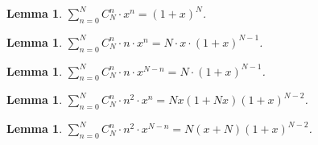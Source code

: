 \documentclass{article}
\newtheorem{lemma}[theorem]{Lemma}
\begin{document}
\begin{lemma}
\label{Sum1}
$\sum_{n=0}^{N}C_N^{n}\cdot x^{n}=(1+x)^N$.
\end{lemma}
\begin{lemma}
\label{Sum2}
$\sum_{n=0}^{N} C_N^{n}\cdot n\cdot x^{n}=N\cdot x\cdot (1+x)^{N-1}$.
\end{lemma}
\begin{lemma}
\label{Sum3}
$\sum_{n=0}^{N} C_N^{n}\cdot n\cdot x^{N-n}=N\cdot (1+x)^{N-1}$.
\end{lemma}
\begin{lemma}
\label{Sum5}
$\sum_{n=0}^{N} C_N^{n}\cdot n^2\cdot x^{n}=Nx(1+Nx)(1+x)^{N-2}$.
\end{lemma}
\begin{lemma}
\label{Sum6}
$\sum_{n=0}^{N} C_N^{n}\cdot n^2\cdot x^{N-n}=N(x+N)(1+x)^{N-2}$.
\end{lemma}
\end{document}
